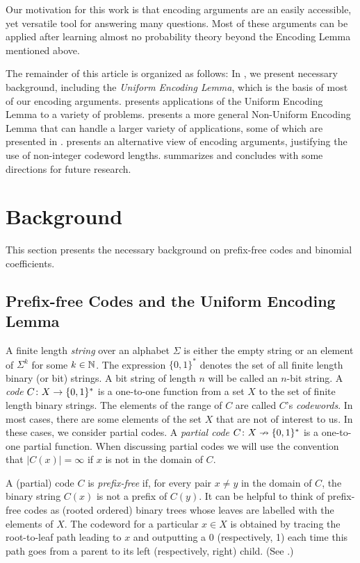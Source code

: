 \documentclass{patmorin}
\begin{document}
Our motivation for this work is that encoding arguments are an easily
accessible, yet versatile tool for answering many questions.  Most of
these arguments can be applied after learning almost no probability
theory beyond the Encoding Lemma mentioned above.

The remainder of this article is organized as follows: In
, we present necessary background, including the
\emph{Uniform Encoding Lemma}, which is the basis of most of our
encoding arguments.   presents applications of
the Uniform Encoding Lemma to a variety of problems.  
presents a more general Non-Uniform Encoding Lemma that can handle a
larger variety of applications, some of which are presented in
.   presents an alternative view of
encoding arguments, justifying the use of non-integer codeword
lengths.   summarizes and concludes with some
directions for future research.

\section{Background}

This section presents the necessary background on prefix-free codes
and binomial coefficients.

\subsection{Prefix-free Codes and the Uniform Encoding Lemma}

A finite length \emph{string} over an alphabet $\Sigma$ is either the
empty string or an element of $\Sigma^k$ for some $k \in \mathbb{N}$. The
expression $\{0, 1\}^*$ denotes the set of all finite length binary
(or bit) strings. A bit string of length $n$ will be called an $n$-bit
string. A \emph{code} $C\colon X\to \{0,1\}^*$ is a one-to-one function
from a set $X$ to the set of finite length binary strings.  The
elements of the range of $C$ are called $C$'s \emph{codewords}.  In
most cases, there are some elements of the set $X$ that are not of
interest to us.  In these cases, we consider partial codes. A
\emph{partial code} $C\colon X\nrightarrow \{0,1\}^*$ is a one-to-one
partial function.  When discussing partial codes we will use the
convention that $|C(x)|=\infty$ if $x$ is not in the domain of $C$.

A (partial) code $C$ is \emph{prefix-free} if, for every pair
$x\neq y$ in the domain of $C$, the binary string $C(x)$ is not a
prefix of $C(y)$.  It can be helpful to think of prefix-free codes as
(rooted ordered) binary trees whose leaves are labelled with the
elements of $X$.  The codeword for a particular $x\in X$ is obtained
by tracing the root-to-leaf path leading to $x$ and outputting a 0
(respectively, 1) each time this path goes from a parent to its left
(respectively, right) child. (See .)
\end{document}
